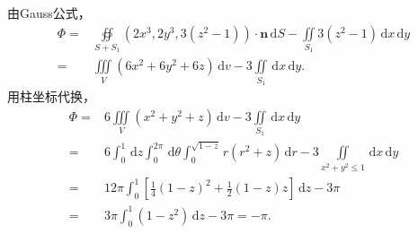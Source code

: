 \documentclass[../main.tex]{subfiles}
\begin{document}
\begin{enumerate}
        由Gauss公式，
        \[
          \begin{aligned}
            \varPhi={} & \oiint\limits_{S+S_{1}}\left(2x^3,2y^3,3(z^{2}-1)\right)\cdot\boldsymbol{n}\,\mathrm{d}S-\iint\limits_{S_{1}}3(z^{2}-1)\,\mathrm{d}x\,\mathrm{d}y \\
            ={}        & \iiint\limits_{V}\left(6x^2+6y^2+6z\right)\,\mathrm{d}v-3\iint\limits_{S_{1}}\,\mathrm{d}x\,\mathrm{d}y.
          \end{aligned}
        \]
        用柱坐标代换，
        \[
          \begin{aligned}
            \varPhi= {} & 6\iiint\limits_{V}\left(x^2+y^2+z\right)\,\mathrm{d}v-3\iint\limits_{S_{1}}\,\mathrm{d}x\,\mathrm{d}y                                                                       \\
            = {}        & 6\int_{0}^{1}\,\mathrm{d}z\int_{0}^{2\pi}\,\mathrm{d}\theta\int_{0}^{\sqrt{1-z}}r\left(r^2+z\right)\,\mathrm{d}r-3\iint\limits_{x^{2}+y^{2}\leq1}\,\mathrm{d}x\,\mathrm{d}y \\
            = {}        & 12\pi\int_{0}^{1}\left[\frac{1}{4}(1-z)^2+\frac{1}{2}(1-z)z\right]\,\mathrm{d}z-3\pi                                                                                        \\
            = {}        & 3\pi\int_{0}^{1}\left(1-z^2\right)\,\mathrm{d}z-3\pi=-\pi.
          \end{aligned}
        \]

\end{enumerate}
\end{document}
